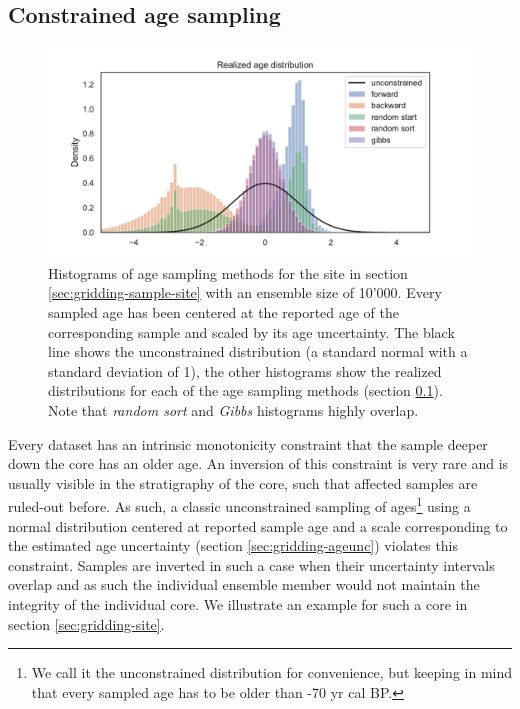 \begin{refsection}
\subsection{Constrained age sampling}  \label{sec:gridding-age-sampling}

\begin{figure}
	\includegraphics[width=\linewidth]{gridding-figures/age-sampling-methods-realized.pdf}
	\caption[Scaled histograms of age sampling methods]{Histograms of age sampling methods for the site in section \ref{sec:gridding-sample-site} with an ensemble size of 10'000. Every sampled age has been centered at the reported age of the corresponding sample and scaled by its age uncertainty. The black line shows the unconstrained distribution (a standard normal with a standard deviation of 1), the other histograms show the realized distributions for each of the age sampling methods (section \ref{sec:gridding-age-sampling}). Note that \textit{random sort} and \textit{Gibbs} histograms highly overlap.}
	\label{fig:gridding-age-sampling-methods}
\end{figure}

Every dataset has an intrinsic monotonicity constraint that the sample deeper down the core has an older age. An inversion of this constraint is very rare and is usually visible in the stratigraphy of the core, such that affected samples are ruled-out before. As such, a classic unconstrained sampling of ages\footnote{\label{foot:unconstrained-note}We call it the unconstrained distribution for convenience, but keeping in mind that every sampled age has to be older than -70 yr cal BP.} using a normal distribution centered at reported sample age and a scale corresponding to the estimated age uncertainty (section \ref{sec:gridding-ageunc}) violates this constraint. Samples are inverted in such a case when their uncertainty intervals overlap and as such the individual ensemble member would not maintain the integrity of the individual core. We illustrate an example for such a core in section \ref{sec:gridding-site}.


\end{refsection}

